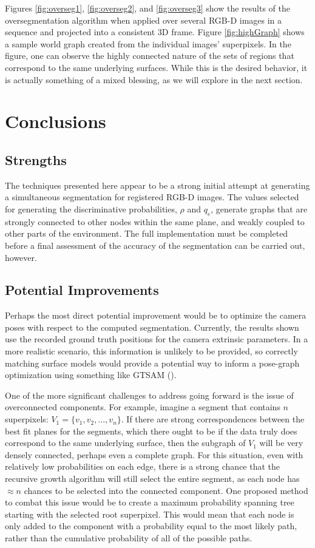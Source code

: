\documentclass[10pt,letterpaper]{article}
\begin{document}
	Figures \ref{fig:overseg1}, \ref{fig:overseg2}, and \ref{fig:overseg3} show the results of the oversegmentation algorithm when applied over several RGB-D images in a sequence and projected into a consistent 3D frame. Figure \ref{fig:highGraph} shows a sample world graph created from the individual images' superpixels. In the figure, one can observe the highly connected nature of the sets of regions that correspond to the same underlying surfaces. While this is the desired behavior, it is actually something of a mixed blessing, as we will explore in the next section.

\section{Conclusions}
\subsection{Strengths}
	The techniques presented here appear to be a strong initial attempt at generating a simultaneous segmentation for registered RGB-D images. The values selected for generating the discriminative probabilities, $\rho$ and $q_e$, generate graphs that are strongly connected to other nodes within the same plane, and weakly coupled to other parts of the environment. The full implementation must be completed before a final assessment of the accuracy of the segmentation can be carried out, however.
\subsection{Potential Improvements}

	Perhaps the most direct potential improvement would be to optimize the camera poses with respect to the computed segmentation. Currently, the results shown use the recorded ground truth positions for the camera extrinsic parameters. In a more realistic scenario, this information is unlikely to be provided, so correctly matching surface models would provide a potential way to inform a pose-graph optimization using something like GTSAM (\cite{gtsam}).
	
	One of the more significant challenges to address going forward is the issue of overconnected components. For example, imagine a segment that contains $n$ superpixels: $V_1=\{v_1,v_2,\ldots,v_n\}$. If there are strong correspondences between the best fit planes for the segments, which there ought to be if the data truly does correspond to the same underlying surface, then the subgraph of $V_1$ will be very densely connected, perhaps even a complete graph. For this situation, even with relatively low probabilities on each edge, there is a strong chance that the recursive growth algorithm will still select the entire segment, as each node has $\approx n$ chances to be selected into the connected component. One proposed method to combat this issue would be to create a maximum probability spanning tree starting with the selected root superpixel. This would mean that each node is only added to the component with a probability equal to the most likely path, rather than the cumulative probability of all of the possible paths.
\end{document}
